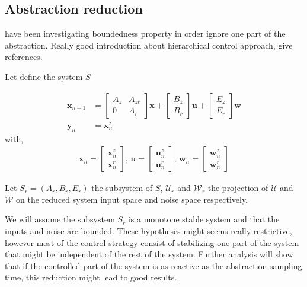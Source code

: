
\subsection{Abstraction reduction}
\cite{liu2014abstraction} have been investigating boundedness property in order ignore one part of the abstraction.
Really good introduction about hierarchical control approach, give references.

Let define the system $S$

\begin{align*}
\mathbf{x}_{n+1} &= 
\begin{bmatrix} A_z & A_{zr}\\ 0 & A_r \end{bmatrix} \mathbf{x}
+\begin{bmatrix} B_z \\ B_r \end{bmatrix} \mathbf{u}
+\begin{bmatrix} E_z\\ E_r \end{bmatrix}\mathbf{w}\\
\mathbf{y}_n &= \mathbf{x}^z_n
\end{align*}
with,
\begin{align*}
\mathbf{x}_n = \begin{bmatrix}
\mathbf{x}^z_n\\
\mathbf{x}^r_n
\end{bmatrix}
\textrm{, }
\mathbf{u} = \begin{bmatrix}
\mathbf{u}^z_n\\
\mathbf{u}^r_n
\end{bmatrix}
\textrm{, }
\mathbf{w}_n = \begin{bmatrix}
\mathbf{w}^z_n\\
\mathbf{w}^r_n
\end{bmatrix}
\end{align*}

Let $S_r=(A_r,B_r,E_r)$ the subsystem of $S$, $\mathcal{U}_r$ and $\mathcal{W}_r$ the projection of $\mathcal{U}$ and $\mathcal{W}$ on the reduced system input space and noise space respectively.

We will assume the subsystem $S_r$ is a monotone stable system and that the inputs and noise are bounded.
These hypotheses might seems really restrictive, however most of the control strategy consist of stabilizing one part of the system that might be independent of the rest of the system.
Further analysis will show that if the controlled part of the system is as reactive as the abstraction sampling time, this reduction might lead to good results.

